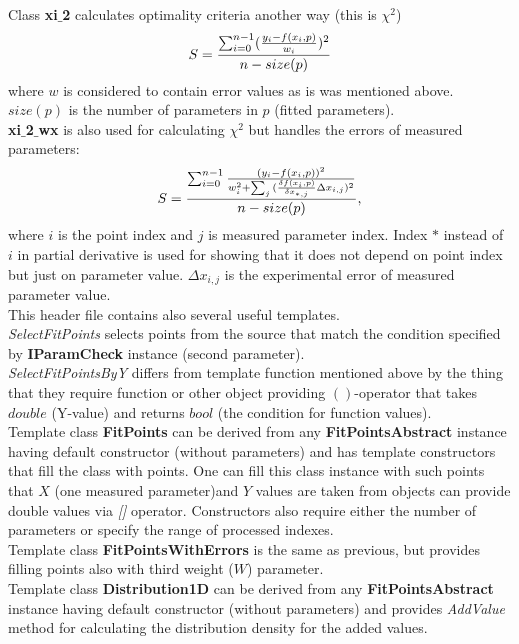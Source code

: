 \documentclass[a4paper]{article}
\begin{document}
\\
Class \textbf{xi$\_$2} calculates optimality criteria another way (this is $\chi^2$)
\begin{equation}\Large
S = \frac{\sum_{i=0}^{n-1}(\frac{y_i-f(x_i,p)}{w_i})^2}{n - size(p)}
\label{chi_2}
\end{equation}
where $w$ is considered to contain error values as is was mentioned above. $size(p)$ is the number of parameters in $p$ (fitted parameters).
\\
\textbf{xi$\_$2$\_$wx} is also used for calculating $\chi^2$ but handles the errors of measured parameters:
\begin{equation}\Large
S = \frac{\sum_{i=0}^{n-1}\frac{(y_i-f(x_i,p))^2}{w_i^2+\sum_j{(\frac{\delta f(x_i,p)}{\delta x_{*,j}}\Delta x_{i,j})^2}}}{n - size(p)},
\label{chi_2_ex}
\end{equation}
where $i$ is the point index and $j$ is measured parameter index.
Index $*$ instead of $i$ in partial derivative is used for showing that it does not depend on point index but just on parameter value.
$\Delta x_{i,j}$ is the experimental error of measured parameter value.\\
This header file contains also several useful templates.\\
\textit{SelectFitPoints} selects points from the source that match the condition specified by \textbf{IParamCheck} instance (second parameter).
\\
\textit{SelectFitPointsByY} differs from template function mentioned above by the thing that they require function or other object providing $()$-operator that takes $double$ (Y-value) and returns $bool$ (the condition for function values).
\\
Template class \textbf{FitPoints} can be derived from any \textbf{FitPointsAbstract} instance having default constructor (without parameters) and has template constructors that fill the class with points. 
One can fill this class instance with such points that $X$ (one measured parameter)and $Y$ values are taken from objects can provide double values via \textit{[]} operator.
Constructors also require either the number of parameters or specify the range of processed indexes.
\\
Template class \textbf{FitPointsWithErrors} is the same as previous, but provides filling points also with third weight ($W$) parameter.
\\
Template class \textbf{Distribution1D} can be derived from any \textbf{FitPointsAbstract} instance having default constructor (without parameters) and provides \textit{AddValue} method for calculating the distribution density for the added values.
\end{document}
